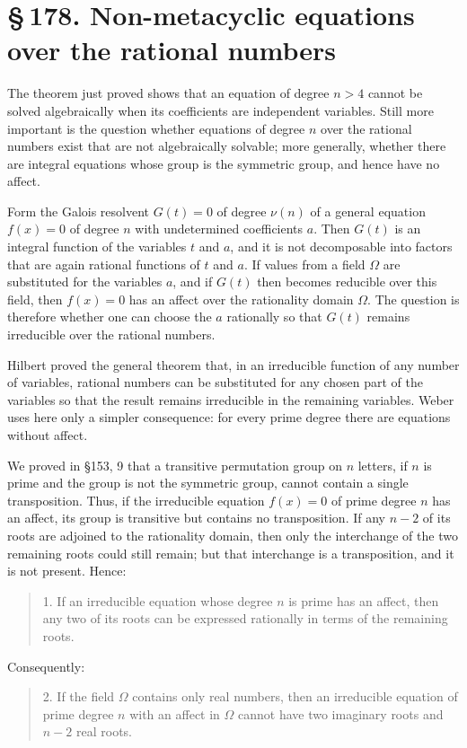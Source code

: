 \documentclass[11pt]{article}
\newcommand{\sect}[2]{\section*{\S\,#1. #2}}
\begin{document}
\sect{178}{Non-metacyclic equations over the rational numbers}

The theorem just proved shows that an equation of degree $n>4$ cannot be solved algebraically when its coefficients are independent variables. Still more important is the question whether equations of degree $n$ over the rational numbers exist that are not algebraically solvable; more generally, whether there are integral equations whose group is the symmetric group, and hence have no affect.

Form the Galois resolvent $G(t)=0$ of degree $\nu(n)$ of a general equation $f(x)=0$ of degree $n$ with undetermined coefficients $a$. Then $G(t)$ is an integral function of the variables $t$ and $a$, and it is not decomposable into factors that are again rational functions of $t$ and $a$. If values from a field $\Omega$ are substituted for the variables $a$, and if $G(t)$ then becomes reducible over this field, then $f(x)=0$ has an affect over the rationality domain $\Omega$. The question is therefore whether one can choose the $a$ rationally so that $G(t)$ remains irreducible over the rational numbers.

Hilbert proved the general theorem that, in an irreducible function of any number of variables, rational numbers can be substituted for any chosen part of the variables so that the result remains irreducible in the remaining variables. Weber uses here only a simpler consequence: for every prime degree there are equations without affect.

We proved in §153, 9 that a transitive permutation group on $n$ letters, if $n$ is prime and the group is not the symmetric group, cannot contain a single transposition. Thus, if the irreducible equation $f(x)=0$ of prime degree $n$ has an affect, its group is transitive but contains no transposition. If any $n-2$ of its roots are adjoined to the rationality domain, then only the interchange of the two remaining roots could still remain; but that interchange is a transposition, and it is not present. Hence:

\begin{quote}
1. If an irreducible equation whose degree $n$ is prime has an affect, then any two of its roots can be expressed rationally in terms of the remaining roots.
\end{quote}

Consequently:
\begin{quote}
2. If the field $\Omega$ contains only real numbers, then an irreducible equation of prime degree $n$ with an affect in $\Omega$ cannot have two imaginary roots and $n-2$ real roots.
\end{quote}
\end{document}
